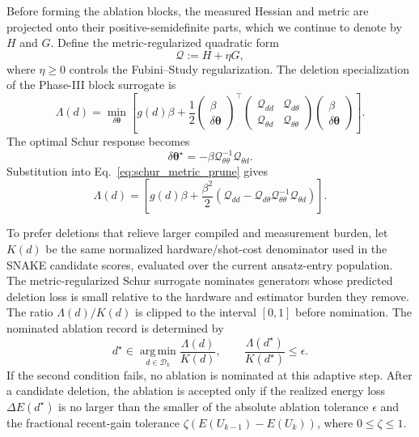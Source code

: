 \documentclass[
  reprint,
  amsmath,
  amssymb,
  aps,
  pra,
  nofootinbib,
  superscriptaddress,
  floatfix
]{revtex4-2}
\begin{document}
Before forming the ablation blocks, the measured Hessian and metric are
projected onto their positive-semidefinite parts, which we continue to denote
by \(H\) and \(G\). Define the metric-regularized quadratic form
\[
\mathcal Q:=H+\eta G,
\]
where \(\eta\ge0\) controls the Fubini--Study regularization. The deletion
specialization of the Phase-III block surrogate is
\begin{equation}
\Lambda(d)
=
\min_{\delta\boldsymbol\theta}
\left[
g(d)\beta
+\frac12
\begin{pmatrix}
\beta\\
\delta\boldsymbol\theta
\end{pmatrix}^{\!\top}
\begin{pmatrix}
\mathcal Q_{dd} & \mathcal Q_{d\theta}\\
\mathcal Q_{\theta d} & \mathcal Q_{\theta\theta}
\end{pmatrix}
\begin{pmatrix}
\beta\\
\delta\boldsymbol\theta
\end{pmatrix}
\right].
\label{eq:schur_metric_prune}
\end{equation}
The optimal Schur response becomes
\begin{equation*}
\delta\boldsymbol\theta^\star
=
-\beta\mathcal Q_{\theta\theta}^{-1}\mathcal Q_{\theta d}.
\end{equation*}
Substitution into Eq.~\eqref{eq:schur_metric_prune} gives
\begin{equation*}
\Lambda(d)
=
\left[
g(d)\beta
+\frac{\beta^2}{2}
\left(
\mathcal Q_{dd}
-\mathcal Q_{d\theta}
\mathcal Q_{\theta\theta}^{-1}
\mathcal Q_{\theta d}
\right)
\right].
\end{equation*}

To prefer deletions that relieve larger compiled and measurement burden, let
\(K(d)\) be the same normalized hardware/shot-cost denominator used in the SNAKE
candidate scores, evaluated over the current ansatz-entry population. The
metric-regularized Schur surrogate nominates generators whose predicted
deletion loss is small relative to the hardware and estimator burden they
remove. The ratio
\(\Lambda(d)/K(d)\) is clipped to the interval \([0,1]\) before nomination.
The nominated ablation record is determined by
\begin{equation*}
d^\star
\in
\operatorname*{arg\,min}_{d\in\mathcal D_k}
\frac{\Lambda(d)}{K(d)},
\qquad
\frac{\Lambda(d^\star)}{K(d^\star)}
\le
\epsilon .
\end{equation*}
If the second condition fails, no ablation is nominated at this adaptive step.
After a candidate deletion, the ablation is accepted only if the realized energy
loss \(\Delta E(d^\star)\) is no larger than the smaller of the absolute
ablation tolerance \(\epsilon\) and the fractional recent-gain tolerance
\(\zeta\left(E(U_{k-1})-E(U_k)\right)\), where \(0\le\zeta\le1\).
\end{document}
